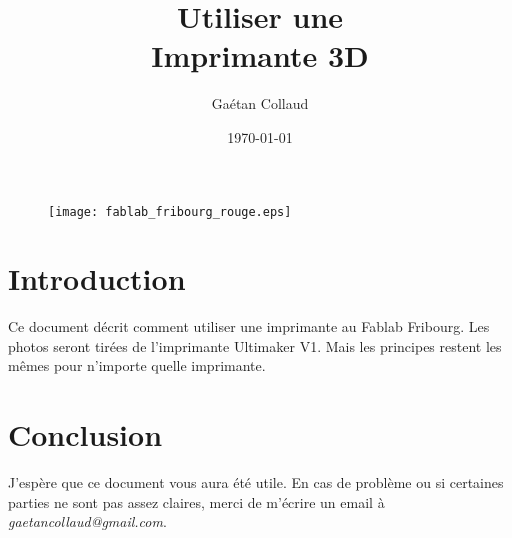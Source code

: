 \documentclass[a4paper,11pt]{article}
\title{ \vspace{2ex}
Utiliser une
\\ \vspace{5ex} \Huge{\textbf{
Imprimante 3D
}}}
\author{Gaétan Collaud}
\date{\vspace{1ex}\today}
\begin{document}
\maketitle

\vspace{10ex}

\begin{figure}[H]
	\centering
	\texttt{[image: fablab\_fribourg\_rouge.eps]}
\end{figure}

\thispagestyle{empty}	

\newpage
\tableofcontents
\newpage

\section{Introduction}

Ce document décrit comment utiliser une imprimante au Fablab Fribourg. Les photos seront tirées de l’imprimante Ultimaker V1. Mais les principes restent les mêmes pour n’importe quelle imprimante.









\section{Conclusion}

J'espère que ce document vous aura été utile. En cas de problème ou si certaines parties ne sont pas assez claires, merci de m'écrire un email à \emph{gaetancollaud@gmail.com}.





%
\end{document}

